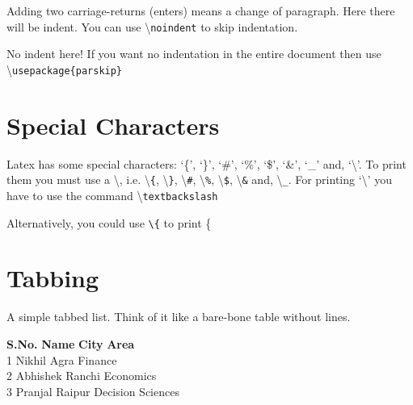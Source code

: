 \documentclass[12pt,twoside,a4paper]{article}
\begin{document}
Adding two carriage-returns (enters) means a change of paragraph. Here there will be indent.
You can use \textbackslash\texttt{noindent} to skip indentation.

\noindent No indent here! If you want no indentation in the entire document then use \textbackslash\texttt{usepackage\{parskip\}}





\section{Special Characters}
Latex has some special characters: `\{’, `\}’, `\#’, `\%', `\$', `\&', `\_' and, `\textbackslash'. To print them you must use a \textbackslash, i.e. \textbackslash\texttt{\{}, \textbackslash\texttt{\}}, \textbackslash\texttt{\#}, \textbackslash\texttt{\%}, \textbackslash\texttt{\$}, \textbackslash\texttt{\&} and, \textbackslash\texttt{\_}. For printing `\textbackslash' you have to use the command \textbackslash\texttt{textbackslash}

\noindent Alternatively, you could use \verb|\{| to print \{


\section{Tabbing}
A simple tabbed list. Think of it like a bare-bone table without lines.
\begin{tabbing}
\textbf{S.No.} \hspace{0.5in} \= \textbf{Name} \hspace{0.5in} \= \textbf{City} \hspace{0.5in} \= \textbf{Area} \\
1 \> Nikhil   \> Agra   \> Finance \\
2 \> Abhishek \> Ranchi \> Economics \\
3 \> Pranjal  \> Raipur \> Decision Sciences \\
\end{tabbing}
\end{document}
